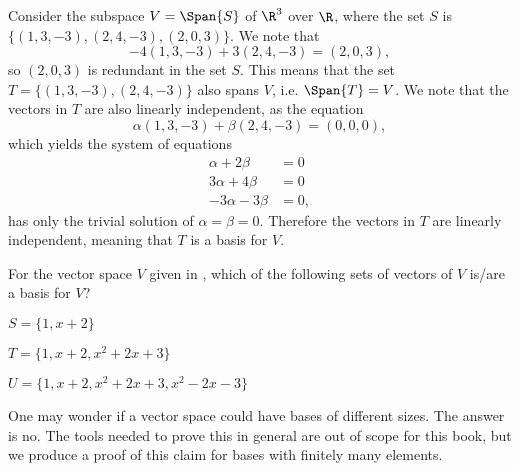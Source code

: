\begin{example}
    Consider the subspace $V = \Span{S}$ of $\R^3$ over $\R$, where the set $S$ is $\{(1, 3, -3), (2, 4, -3), (2, 0, 3)\}$. We note that
    \[
        -4(1, 3, -3) + 3(2, 4, -3) = (2, 0, 3),
    \]
    so $(2, 0, 3)$ is redundant in the set $S$. This means that the set $T = \{(1, 3, -3), (2, 4, -3)\}$ also spans $V$, i.e. $\Span{T} = V$. We note that the vectors in $T$ are also linearly independent, as the equation
    \[
        \alpha(1, 3, -3) + \beta(2, 4, -3) = (0, 0, 0),
    \]
    which yields the system of equations
    \begin{align*}
        \alpha + 2\beta &= 0\\
        3\alpha + 4\beta &= 0\\
        -3\alpha - 3\beta &= 0,
    \end{align*}
    has only the trivial solution of $\alpha = \beta = 0$. Therefore the vectors in $T$ are linearly independent, meaning that $T$ is a basis for $V$.
\end{example}

\begin{exercise}
    For the vector space $V$ given in , which of the following sets of vectors of $V$ is/are a basis for $V$?
    \begin{partquestions}{\alph*}
        \item $S = \{1, x + 2\}$
        \item $T = \{1, x + 2, x^2 + 2x + 3\}$
        \item $U = \{1, x + 2, x^2 + 2x + 3, x^2 - 2x - 3\}$
    \end{partquestions}
\end{exercise}

One may wonder if a vector space could have bases of different sizes. The answer is no. The tools needed to prove this in general are out of scope for this book, but we produce a proof of this claim for bases with finitely many elements.

